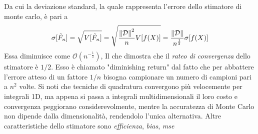 Da cui la deviazione standard, la quale rappresenta l'errore dello stimatore di monte carlo, \`e pari a
\begin{equation}
	\sigma[\tilde{F}_n]=\sqrt{V[\tilde{F}_n]}=\sqrt{\frac{\norm{\mathcal{D}}^2}{n}V[f(X)]}=\frac{\norm{\mathcal{D}}}{n^{\frac{1}{2}}}\sigma[f(X)]
\end{equation}
Essa diminuisce come \mbox{$\mathcal{O}\left(n^{-\frac{1}{2}}\right)$}, Il che dimostra che il \textit{rateo di convergenza} dello stimatore \`e 
$1/2$. Esso \`e chiamato "diminishing return" dal fatto che 
per abbattere l'errore atteso di un fattore $1/n$ bisogna campionare un numero di campioni pari a $n^2$ volte. Si noti che tecniche di quadratura 
convergono pi\`u velocemente per integrali 1D, ma appena si passa a integrali multidimensionali il loro costo e convergenza peggiorano 
considerevolmente, mentre la accuratezza di Monte Carlo non dipende dalla dimensionalit\`a, rendendolo l'unica alternativa.
Altre caratteristiche dello stimatore sono \textit{efficienza}, \textit{bias}, \textit{mse}
